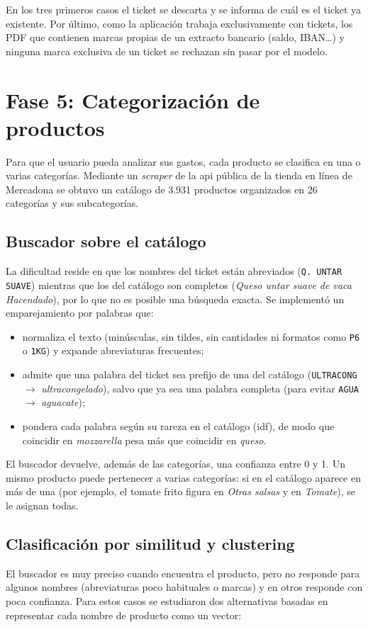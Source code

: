 En los tres primeros casos el ticket se descarta y se informa de cuál es el ticket ya existente. Por último, como la aplicación trabaja exclusivamente con tickets, los PDF que contienen marcas propias de un extracto bancario (saldo, IBAN\ldots) y ninguna marca exclusiva de un ticket se rechazan sin pasar por el modelo.

\section{Fase 5: Categorización de productos}
\label{s:categorizacion}
Para que el usuario pueda analizar sus gastos, cada producto se clasifica en una o varias categorías. Mediante un \textit{scraper} de la \gls{api} pública de la tienda en línea de Mercadona se obtuvo un catálogo de 3.931 productos organizados en 26 categorías y sus subcategorías.

\subsection{Buscador sobre el catálogo}
La dificultad reside en que los nombres del ticket están abreviados (\texttt{Q. UNTAR SUAVE}) mientras que los del catálogo son completos (\textit{Queso untar suave de vaca Hacendado}), por lo que no es posible una búsqueda exacta. Se implementó un emparejamiento por palabras que:

\begin{itemize}
    \item normaliza el texto (minúsculas, sin tildes, sin cantidades ni formatos como \texttt{P6} o \texttt{1KG}) y expande abreviaturas frecuentes;
    \item admite que una palabra del ticket sea prefijo de una del catálogo (\texttt{ULTRACONG} $\rightarrow$ \textit{ultracongelado}), salvo que ya sea una palabra completa (para evitar \texttt{AGUA} $\rightarrow$ \textit{aguacate});
    \item pondera cada palabra según su rareza en el catálogo (\gls{idf}), de modo que coincidir en \textit{mozzarella} pesa más que coincidir en \textit{queso}.
\end{itemize}

El buscador devuelve, además de las categorías, una confianza entre 0 y 1. Un mismo producto puede pertenecer a varias categorías: si en el catálogo aparece en más de una (por ejemplo, el tomate frito figura en \textit{Otras salsas} y en \textit{Tomate}), se le asignan todas.

\subsection{Clasificación por similitud y clustering}
\label{s:clasificador-hibrido}
El buscador es muy preciso cuando encuentra el producto, pero no responde para algunos nombres (abreviaturas poco habituales o marcas) y en otros responde con poca confianza. Para estos casos se estudiaron dos alternativas basadas en representar cada nombre de producto como un vector:

